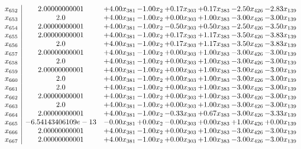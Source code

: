 \documentclass[8pt]{article}
\begin{document}
\[\begin{array}{c| c c@{\hskip 2pt} c@{\hskip 2pt} c@{\hskip 2pt} c@{\hskip 2pt} c@{\hskip 2pt} c@{\hskip 2pt} }
 x_{652}   &  2.00000000001 & +  4.00 x_{381} & -1.00 x_{2} & +  0.17 x_{303} & +  0.17 x_{383} & -2.50 x_{426} & -2.83 x_{139}\\
 x_{653}   &  2.0 & +  4.00 x_{381} & -1.00 x_{2} & +  0.00 x_{303} & +  1.00 x_{383} & -3.00 x_{426} & -3.00 x_{139}\\
 x_{654}   &  2.00000000001 & +  4.00 x_{381} & -1.00 x_{2} & -0.50 x_{303} & +  0.50 x_{383} & -2.50 x_{426} & -3.50 x_{139}\\
 x_{655}   &  2.00000000001 & +  4.00 x_{381} & -1.00 x_{2} & +  0.17 x_{303} & +  1.17 x_{383} & -3.50 x_{426} & -3.83 x_{139}\\
 x_{656}   &  2.0 & +  4.00 x_{381} & -1.00 x_{2} & +  0.17 x_{303} & +  1.17 x_{383} & -3.50 x_{426} & -3.83 x_{139}\\
 x_{657}   &  2.00000000001 & +  4.00 x_{381} & -1.00 x_{2} & +  0.00 x_{303} & +  1.00 x_{383} & -3.00 x_{426} & -3.00 x_{139}\\
 x_{658}   &  2.0 & +  4.00 x_{381} & -1.00 x_{2} & +  0.00 x_{303} & +  1.00 x_{383} & -3.00 x_{426} & -3.00 x_{139}\\
 x_{659}   &  2.00000000001 & +  4.00 x_{381} & -1.00 x_{2} & +  0.00 x_{303} & +  1.00 x_{383} & -3.00 x_{426} & -3.00 x_{139}\\
 x_{660}   &  2.0 & +  4.00 x_{381} & -1.00 x_{2} & +  0.00 x_{303} & +  1.00 x_{383} & -3.00 x_{426} & -3.00 x_{139}\\
 x_{661}   &  2.0 & +  4.00 x_{381} & -1.00 x_{2} & +  0.00 x_{303} & +  1.00 x_{383} & -3.00 x_{426} & -3.00 x_{139}\\
 x_{662}   &  2.00000000001 & +  4.00 x_{381} & -1.00 x_{2} & +  0.00 x_{303} & +  1.00 x_{383} & -3.00 x_{426} & -3.00 x_{139}\\
 x_{663}   &  2.0 & +  4.00 x_{381} & -1.00 x_{2} & +  0.00 x_{303} & +  1.00 x_{383} & -3.00 x_{426} & -3.00 x_{139}\\
 x_{664}   &  2.00000000001 & +  4.00 x_{381} & -1.00 x_{2} & -0.33 x_{303} & +  0.67 x_{383} & -3.00 x_{426} & -3.33 x_{139}\\
 x_{665}   &  -6.54143406109e-13 & -0.00 x_{381} & +  0.00 x_{2} & -0.00 x_{303} & +  0.00 x_{383} & +  1.00 x_{426} & +  0.00 x_{139}\\
 x_{666}   &  2.00000000001 & +  4.00 x_{381} & -1.00 x_{2} & +  0.00 x_{303} & +  1.00 x_{383} & -3.00 x_{426} & -3.00 x_{139}\\
 x_{667}   &  2.00000000001 & +  4.00 x_{381} & -1.00 x_{2} & +  0.00 x_{303} & +  1.00 x_{383} & -3.00 x_{426} & -3.00 x_{139}\\

\end{array}\]
\end{document}
